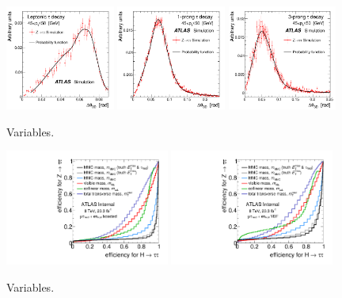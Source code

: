 \begin{figure}[tp]
  \centering
  \includegraphics[width=0.32\textwidth]{figures/ATLAS-CONF-2011-132/fig_01a}
  \includegraphics[width=0.32\textwidth]{figures/ATLAS-CONF-2011-132/fig_01b}
  \includegraphics[width=0.32\textwidth]{figures/ATLAS-CONF-2011-132/fig_01c}
  \caption{Variables.}
  \label{fig:strategy-mtautau-inputs}
\end{figure}

\begin{figure}[tp]
  \centering
  \includegraphics[width=0.48\textwidth]{figures/mtautau/mtautau-ROC-boost}
  \includegraphics[width=0.48\textwidth]{figures/mtautau/mtautau-ROC-vbf}
  \caption{Variables.}
  \label{fig:strategy-mtautau-ROC}
\end{figure}

